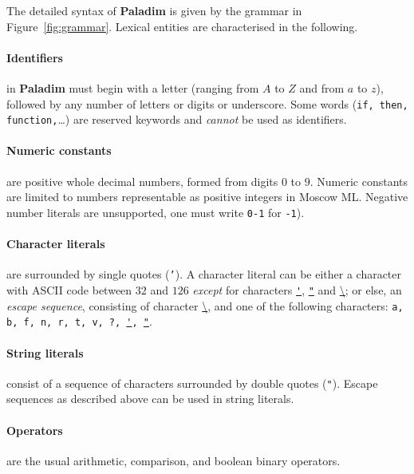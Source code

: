 \documentclass[12pt,a4paper]{article}
\newcommand{\paladim}{\textbf{Paladim}\xspace}
\begin{document}
The detailed syntax of \paladim is given by the grammar in Figure~\ref{fig:grammar}.
Lexical entities are characterised in the following.

\paragraph*{Identifiers} in \paladim must begin with a letter
    (ranging from $A$ to $Z$ and from $a$ to $z$),
    followed by any number of letters or digits or underscore.
   Some words ({\tt if, then, function,}\ldots) are reserved keywords and
   {\em cannot} be used as identifiers.

\paragraph*{Numeric constants} are positive whole decimal numbers, formed from digits
   $0$ to $9$. Numeric constants are limited to numbers representable
   as positive integers in Moscow ML.
%
  Negative number literals are unsupported, one must write {\tt 0-1} for
  {\tt -1}).

\paragraph*{Character literals} are surrounded by single quotes
   (\texttt {'}). A character literal can be either
    a character with ASCII code between $32$ and $126$ \emph{except}
     for characters \texttt{\underline'}, \texttt {\underline"} and
     \underline{\textbackslash};
    or else, an \emph{escape sequence}, consisting of character
    \underline\textbackslash, and one of the following characters:
    \texttt{a, b, f, n, r, t, v, ?, \underline', \underline"}.

\paragraph*{String literals} consist of a sequence of characters surrounded by
    double quotes (\texttt {"}). Escape sequences as described above can be used
    in string literals.

\paragraph*{Operators} are the usual arithmetic, comparison, and boolean
    binary operators.
\end{document}
